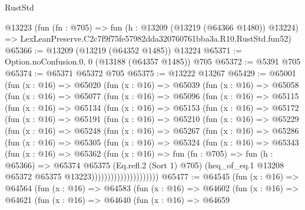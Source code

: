 \begin{lexlean}{RustStd}
\begin{coremodule}
    @13223
    (fun (fn : @705) =>
    fun (h : @13209 (@13219 (@64366 @1480)) @13224) =>
    LexLeanPreserve.C2c7f9f75fe57982dda320760761bba3a.R10.RustStd.fun52)
@65366 := @13209 (@13219 (@64352 @1485)) @13224
@65371 := Option.noConfusion.{0, 0} (@13188 (@64357 @1485)) @705
@65372 := @5391 @705
@65374 := @65371 @65372 @705
@65375 := @13222 @13267
@65429 := @65001
    (fun (x : @16) =>
    @65020
      (fun (x : @16) =>
      @65039
        (fun (x : @16) =>
        @65058
          (fun (x : @16) =>
          @65077
            (fun (x : @16) =>
            @65096
              (fun (x : @16) =>
              @65115
                (fun (x : @16) =>
                @65134
                  (fun (x : @16) =>
                  @65153
                    (fun (x : @16) =>
                    @65172
                      (fun (x : @16) =>
                      @65191
                        (fun (x : @16) =>
                        @65210
                          (fun (x : @16) =>
                          @65229
                            (fun (x : @16) =>
                            @65248
                              (fun (x : @16) =>
                              @65267
                                (fun (x : @16) =>
                                @65286
                                  (fun (x : @16) =>
                                  @65305
                                    (fun (x : @16) =>
                                    @65324
                                      (fun (x : @16) =>
                                      @65343
                                        (fun (x : @16) =>
                                        @65362
                                          (fun (x : @16) =>
                                          fun (fn : @705) =>
                                          fun (h : @65366) =>
                                          @65374
                                            @65375
                                            (Eq.refl.{2} (Sort 1) @705)
                                            (heq_of_eq.{1}
                                              @13208
                                              @65372
                                              @65375
                                              @13223)))))))))))))))))))))
@65477 := @64545
    (fun (x : @16) =>
    @64564
      (fun (x : @16) =>
      @64583
        (fun (x : @16) =>
        @64602
          (fun (x : @16) =>
          @64621
            (fun (x : @16) =>
            @64640
              (fun (x : @16) =>
              @64659

\end{coremodule}
\end{lexlean}
